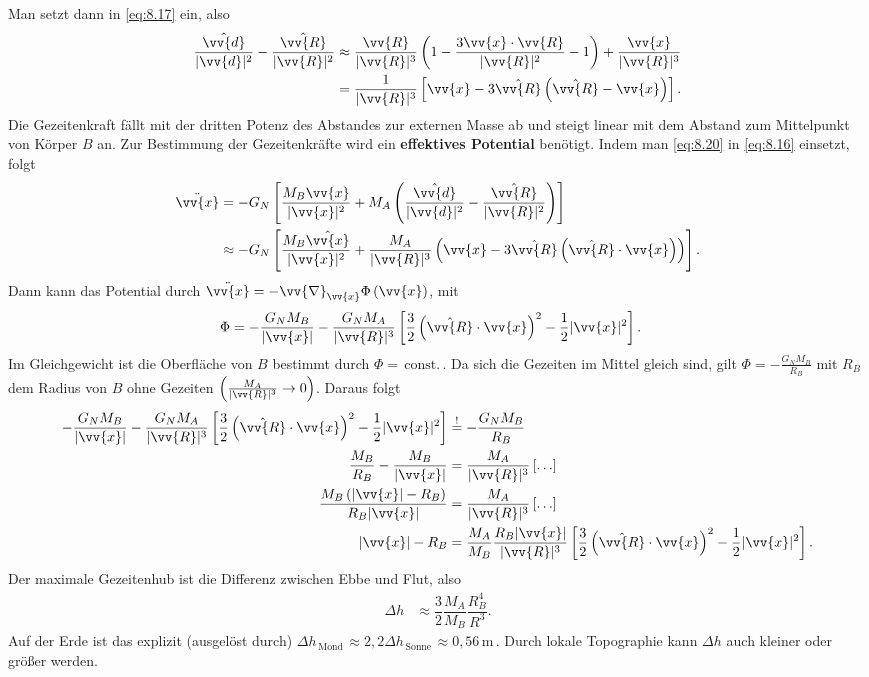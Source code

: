 \documentclass[a4paper,12pt]{article}
\numberwithin{equation}{section}
\begin{document}
Man setzt dann in \eqref{eq:8.17} ein, also
\begin{align} 
        \dfrac{\hat{\vv{d} }}{|\vv{d}|^2}-\dfrac{\hat{\vv{R} }}{|\vv{R}|^2}&\approx \dfrac{\vv{R}}{|\vv{R}|^3}\left(1-\dfrac{3\vv{x}\cdot \vv{R}}{|\vv{R}|^2}-1\right)+\dfrac{\vv{x}}{|\vv{R}|^3}\nonumber \\
                                                                         &=\dfrac{1}{|\vv{R}|^3}\left[\vv{x}-3\hat{\vv{R}}\left(\hat{\vv{R}}-\vv{x}\right)\right]\label{eq:8.20}
.\end{align} 
Die Gezeitenkraft fällt mit der dritten Potenz des Abstandes zur externen Masse ab und steigt linear mit dem Abstand zum Mittelpunkt von \glqq Körper $B$\grqq{} an. Zur Bestimmung der Gezeitenkräfte wird ein \textbf{effektives Potential} benötigt. Indem man \eqref{eq:8.20} in \eqref{eq:8.16} einsetzt, folgt
\begin{align*} 
        \ddot{\vv{x}}&=-G_N\left[\dfrac{M_B\vv{x}}{|\vv{x}|^2}+M_A\left(\dfrac{\hat{\vv{d} }}{|\vv{d}|^2}-\dfrac{\hat{\vv{R} }}{|\vv{R}|^2}\right)\right]\\
                     &\approx -G_N\left[\dfrac{M_B\hat{\vv{x} }}{|\vv{x}|^2}+\dfrac{M_A}{|\vv{R}|^3}\left(\vv{x}-3\hat{\vv{R}}\left(\hat{\vv{R}}\cdot \vv{x}\right)\right)\right]
.\end{align*} 
Dann kann das Potential durch $\ddot{\vv{x}}=-\vv{\nabla }_{\vv{x}}\Phi \left(\vv{x}\right)$, mit
\begin{align*} 
        \Phi &=-\dfrac{G_NM_B}{|\vv{x}|}-\dfrac{G_NM_A}{|\vv{R}|^3}\left[\dfrac{3}{2}\left(\hat{\vv{R}}\cdot \vv{x}\right)^2-\dfrac{1}{2}|\vv{x}|^2\right]
.\end{align*} 
Im Gleichgewicht ist die Oberfläche von $B$ bestimmt durch $\Phi =\,\text{const.}\,$. Da sich die Gezeiten im Mittel gleich sind, gilt $\Phi =-\tfrac{G_NM_B}{R_B}$ mit $R_B$ dem Radius von $B$ ohne Gezeiten $\left(\tfrac{M_A}{|\vv{R}|^3}\rightarrow 0\right)$. Daraus folgt
\begin{align} 
        -\dfrac{G_NM_B}{|\vv{x}|}-\dfrac{G_NM_A}{|\vv{R}|^3}\left[\dfrac{3}{2}\left(\hat{\vv{R}}\cdot \vv{x}\right)^2-\dfrac{1}{2}|\vv{x}|^2\right]&\stackrel{!}{=}-\dfrac{G_NM_B}{R_B}\nonumber \\
        \dfrac{M_B}{R_B}-\dfrac{M_B}{|\vv{x}|}&=\dfrac{M_A}{|\vv{R}|^3}\left[\hdots \right]\nonumber \\
        \dfrac{M_B\left(|\vv{x}|-R_B\right)}{R_B|\vv{x}|}&=\dfrac{M_A}{|\vv{R}|^3}\left[\hdots \right]\nonumber \\
        |\vv{x}|-R_B&=\dfrac{M_A}{M_B}\dfrac{R_B|\vv{x}|}{|\vv{R}|^3}\left[\dfrac{3}{2}\left(\hat{\vv{R}}\cdot \vv{x}\right)^2-\dfrac{1}{2}|\vv{x}|^2\right]\nonumber 
.\end{align} 
Der maximale Gezeitenhub ist die Differenz zwischen Ebbe und Flut, also 
\begin{align} 
        \Delta h&\approx \dfrac{3}{2}\dfrac{M_A}{M_B}\dfrac{R_B^4}{R^3}
.\end{align} 
Auf der Erde ist das explizit (ausgelöst durch) $\Delta h_{\,\text{Mond}\,}\approx 2,2\Delta h_{\,\text{Sonne}\,}\approx 0,56\,\text{m}\,$. Durch lokale Topographie kann $\Delta h$ auch kleiner oder größer werden.
\end{document}
